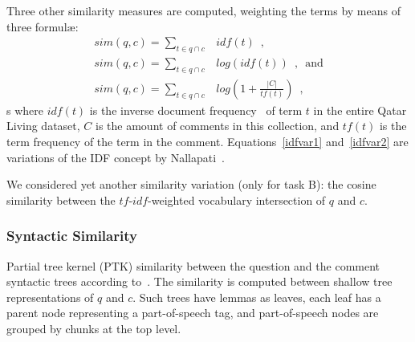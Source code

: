 Three other similarity measures are computed, weighting the terms by means of 
three 
formul\ae: 
%
\begin{eqnarray}
 sim(q, c)=\sum_{t\in q\cap c} & idf(t) \enspace,		\\
 sim(q, c)=\sum_{t\in q\cap c} & log(idf(t)) \enspace, \enspace \mathrm{and} 
\label{idfvar1}\\
 sim(q, c)=\sum_{t\in q\cap c} & log\left(1 + \frac{|C|}{tf(t)}\right) \enspace 
,
\label{idfvar2}
\end{eqnarray}
s
% 
where $idf(t)$ is the inverse document frequency~\cite{Jones:1972} of term $t$ 
in the entire Qatar Living dataset, $C$ is the amount of comments in this collection, 
and $tf(t)$ is the term frequency of the term in the comment. 
Equations~\ref{idfvar1} and~\ref{idfvar2} are variations of the IDF concept by 
Nallapati~.

We considered yet another similarity variation (only for task B): the cosine 
similarity between the $tf$-$idf$-weighted vocabulary intersection of $q$ and 
$c$.


\subsubsection{Syntactic Similarity}
\label{sub:syntactic}

Partial tree kernel (PTK) similarity between the question and the comment 
syntactic trees according to~\cite{Moschitti:2006}. The similarity is computed 
between shallow tree  representations of $q$ and $c$. Such trees have lemmas as 
leaves, each leaf has a parent node representing a part-of-speech tag, and 
part-of-speech nodes are grouped by chunks at the top level.

